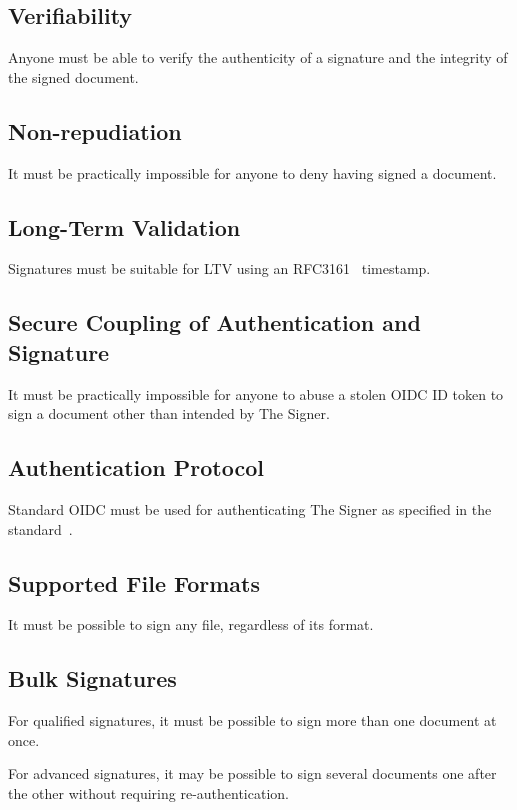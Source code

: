 \subsection{Verifiability}\label{subsec:verifiability}
Anyone must be able to verify the authenticity of a signature and the integrity of the signed document.

\subsection{Non-repudiation}\label{subsec:non-repudiation}
It must be practically impossible for anyone to deny having signed a document.

\subsection{Long-Term Validation}\label{subsec:req-long-term-validation}
Signatures must be suitable for \gls{LTV} using an RFC3161~\cite{rfc3161} timestamp.

\subsection{Secure Coupling of Authentication and Signature}\label{subsec:secure-coupling-of-authentication-and-signature}
It must be practically impossible for anyone to abuse a stolen \gls{OIDC} ID token to sign a document other than intended by The Signer.

\subsection{Authentication Protocol}\label{subsec:authentication-protocol}
Standard \gls{OIDC} must be used for authenticating The Signer as specified in the standard~\cite{oidc}.

\subsection{Supported File Formats}\label{subsec:supported-file-formats}
It must be possible to sign any file, regardless of its format.

\subsection{Bulk Signatures}\label{subsec:bulk-signatures}
For qualified signatures, it must be possible to sign more than one document at once.

For advanced signatures, it may be possible to sign several documents one after the other without requiring re-authentication.

